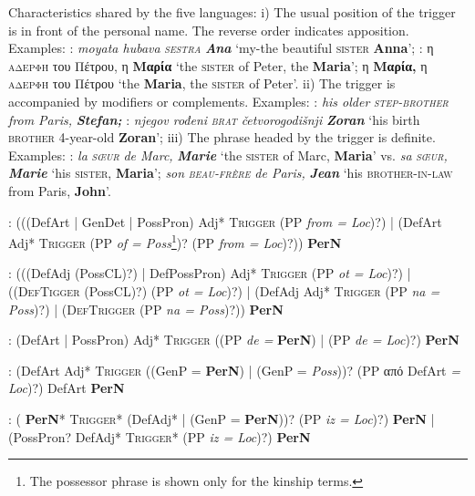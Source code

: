 \documentclass[output=paper]{langsci/langscibook}
\newcommand{\trigger}[1]{\textsc{#1}}
\begin{document}
Characteristics shared by the five languages: i) The usual position of
the trigger is in front of the personal name. The reverse order
indicates apposition. Examples: : \textit{moyata hubava
}\textit{\trigger{sestra}} \textbf{\textit{Ana}} ‘my-the beautiful
\trigger{sister} \textbf{Anna}’; : η \trigger{αδερφή}
του Πέτρου, η \textbf{Μαρία} ‘the \trigger{sister} of
Peter, the \textbf{Maria}’; η \textbf{Μαρία,}
η \trigger{αδερφή} του Πέτρου ‘the
\textbf{Maria}, the \trigger{sister} of Peter’. ii) The trigger is
accompanied by modifiers or complements. Examples: : \textit{his
older }\textit{\trigger{step-brother}} \textit{from Paris,}
\textbf{\textit{Stefan; }}: \textit{njegov rođeni
}\textit{\trigger{brat}} \textit{četvorogodišnji} \textbf{\textit{Zoran
}}‘his birth \trigger{brother} 4-year-old \textbf{Zoran}’; iii) The
phrase headed by the trigger is definite. Examples: : \textit{la
}\textit{\trigger{sœur}} \textit{de Marc,} \textbf{\textit{Marie}} ‘the
\trigger{sister} of Marc, \textbf{Maria}’ vs. \textit{sa
}\textit{\trigger{sœur}}\textit{,} \textbf{\textit{Marie}} ‘his
\trigger{sister}, \textbf{Maria}’; \textit{son}\trigger{
}\textit{\trigger{beau-frère}} \textit{de Paris,} \textbf{\textit{Jean}}
‘his \trigger{brother-in-law} from Paris, \textbf{John}’.

: (((DefArt | GenDet | PossPron) Adj* \trigger{Trigger} (PP \textit{from
= Loc})?) | (DefArt Adj* \trigger{Trigger} (PP \textit{of =
Poss}\footnote{The possessor phrase is shown only for the kinship terms.})? (PP
\textit{from = Loc})?)) \textbf{PerN}



: (((DefAdj (PossCL)?) | DefPossPron) Adj* \trigger{Trigger} (PP
\textit{ot = Loc})?) | ((\trigger{DefTigger} (PossCL)?) (PP \textit{ot =
Loc})?) | (DefAdj Adj* \trigger{Trigger} (PP \textit{na = Poss})?) |
(\trigger{DefTrigger} (PP \textit{na = Poss})?))  \textbf{PerN}



: (DefArt | PossPron) Adj* \trigger{Trigger} ((PP \textit{de = } \textbf{PerN}) |
(PP \textit{de = Loc})?)  \textbf{PerN}



: (DefArt Adj* \trigger{Trigger} ((GenP =  \textbf{PerN}) | (GenP =
\textit{Poss}))? (PP από DefArt \textit{= Loc})?) DefArt  \textbf{PerN}



: ( \textbf{PerN}* \trigger{Trigger}* (DefAdj* | (GenP =  \textbf{PerN}))? (PP \textit{iz
= Loc})?)  \textbf{PerN} | (PossPron? DefAdj* \trigger{Trigger}* (PP \textit{iz =
Loc})?)  \textbf{PerN}
\end{document}

